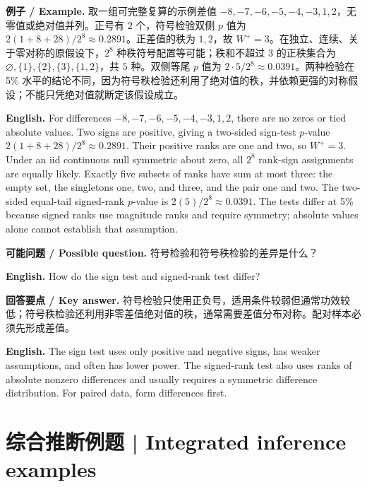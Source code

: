 \documentclass[UTF8,11pt,a4paper]{ctexart}
\newcommand{\EN}[1]{\par\noindent\textbf{English.} #1\par}
\newcommand{\EX}[2]{\par\noindent\textbf{例子 / Example.} #1\par\EN{#2}}
\newcommand{\ASK}[4]{\par\noindent\textbf{可能问题 / Possible question.} #1\par\EN{#2}\noindent\textbf{回答要点 / Key answer.} #3\par\EN{#4}\medskip}
\begin{document}
\EX{取一组可完整复算的示例差值 $-8,-7,-6,-5,-4,-3,1,2$，无零值或绝对值并列。正号有 $2$ 个，符号检验双侧 $p$ 值为 $2(1+8+28)/2^8\approx0.2891$。正差值的秩为 $1,2$，故 $W^+=3$。在独立、连续、关于零对称的原假设下，$2^8$ 种秩符号配置等可能；秩和不超过 $3$ 的正秩集合为 $\varnothing,\{1\},\{2\},\{3\},\{1,2\}$，共 $5$ 种。双侧等尾 $p$ 值为 $2\cdot5/2^8\approx0.0391$。两种检验在 5\% 水平的结论不同，因为符号秩检验还利用了绝对值的秩，并依赖更强的对称假设；不能只凭绝对值就断定该假设成立。}{For differences $-8,-7,-6,-5,-4,-3,1,2$, there are no zeros or tied absolute values. Two signs are positive, giving a two-sided sign-test $p$-value $2(1+8+28)/2^8\approx0.2891$. Their positive ranks are one and two, so $W^+=3$. Under an iid continuous null symmetric about zero, all $2^8$ rank-sign assignments are equally likely. Exactly five subsets of ranks have sum at most three: the empty set, the singletons one, two, and three, and the pair one and two. The two-sided equal-tail signed-rank $p$-value is $2(5)/2^8\approx0.0391$. The tests differ at 5\% because signed ranks use magnitude ranks and require symmetry; absolute values alone cannot establish that assumption.}

\ASK{符号检验和符号秩检验的差异是什么？}{How do the sign test and signed-rank test differ?}{符号检验只使用正负号，适用条件较弱但通常功效较低；符号秩检验还利用非零差值绝对值的秩，通常需要差值分布对称。配对样本必须先形成差值。}{The sign test uses only positive and negative signs, has weaker assumptions, and often has lower power. The signed-rank test also uses ranks of absolute nonzero differences and usually requires a symmetric difference distribution. For paired data, form differences first.}

\section{综合推断例题 | Integrated inference examples}
\end{document}
